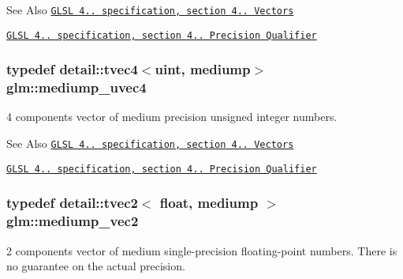 \begin{DoxySeeAlso}{See Also}
\href{http://www.opengl.org/registry/doc/GLSLangSpec.4.20.8.pdf}{\tt G\-L\-S\-L 4.. specification, section 4.. Vectors} 

\href{http://www.opengl.org/registry/doc/GLSLangSpec.4.20.8.pdf}{\tt G\-L\-S\-L 4.. specification, section 4.. Precision Qualifier} 
\end{DoxySeeAlso}
\hypertarget{group__core__precision_gad90c29c2643136a9bcb1165eac47c810}{
\subsubsection[{mediump\-\_\-uvec4}]{\setlength{\rightskip}{0pt plus 5cm}typedef detail\-::tvec4$<$uint, mediump$>$ {\bf glm\-::mediump\-\_\-uvec4}}}\label{group__core__precision_gad90c29c2643136a9bcb1165eac47c810}
4 components vector of medium precision unsigned integer numbers.

\begin{DoxySeeAlso}{See Also}
\href{http://www.opengl.org/registry/doc/GLSLangSpec.4.20.8.pdf}{\tt G\-L\-S\-L 4.. specification, section 4.. Vectors} 

\href{http://www.opengl.org/registry/doc/GLSLangSpec.4.20.8.pdf}{\tt G\-L\-S\-L 4.. specification, section 4.. Precision Qualifier} 
\end{DoxySeeAlso}
\hypertarget{group__core__precision_ga1365858c541931eb8a7473fa85a1d1cf}{
\subsubsection[{mediump\-\_\-vec2}]{\setlength{\rightskip}{0pt plus 5cm}typedef detail\-::tvec2$<$ float, mediump $>$ {\bf glm\-::mediump\-\_\-vec2}}}\label{group__core__precision_ga1365858c541931eb8a7473fa85a1d1cf}
2 components vector of medium single-\/precision floating-\/point numbers. There is no guarantee on the actual precision.


